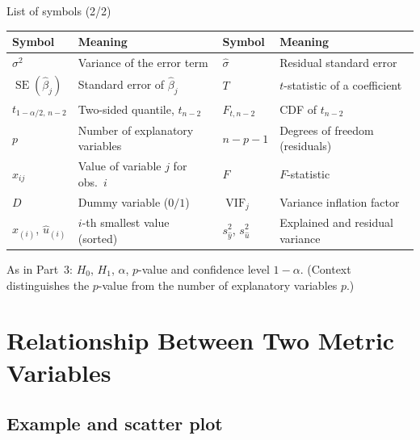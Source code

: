 \documentclass[aspectratio=169,11pt]{beamer}
\begin{document}
\begin{frame}{List of symbols (2/2)}
  \begin{center}
    \small
    \renewcommand{\arraystretch}{1.15}
    \begin{tabular}{@{}l>{\raggedright\arraybackslash}p{4.5cm}l>{\raggedright\arraybackslash}p{4.5cm}@{}}
      \toprule
      \textbf{Symbol} & \textbf{Meaning} & \textbf{Symbol} & \textbf{Meaning} \\
      \midrule
      $\sigma^2$ & Variance of the error term & $\hat\sigma$ & Residual standard error \\
      $\operatorname{SE}(\hat\beta_j)$ & Standard error of $\hat\beta_j$ & $T$ & $t$-statistic of a coefficient \\
      $t_{1-\alpha/2,\,n-2}$ & Two-sided quantile, $t_{n-2}$ & $F_{t,n-2}$ & CDF of $t_{n-2}$ \\
      $p$ & Number of explanatory variables & $n-p-1$ & Degrees of freedom (residuals) \\
      $x_{ij}$ & Value of variable $j$ for obs.\ $i$ & $F$ & $F$-statistic \\
      $D$ & Dummy variable ($0/1$) & $\operatorname{VIF}_j$ & Variance inflation factor \\
      $x_{(i)}$, $\hat u_{(i)}$ & $i$-th smallest value (sorted) & $s_{\hat y}^2$, $s_{\hat u}^2$ & Explained and residual variance \\
      \bottomrule
    \end{tabular}
  \end{center}
  \begin{center}
    \footnotesize As in Part~3: $H_0$, $H_1$, $\alpha$, $p$-value and
    confidence level $1-\alpha$. (Context distinguishes the $p$-value from the
    number of explanatory variables $p$.)
  \end{center}
\end{frame}

\section[Correlation]{Relationship Between Two Metric Variables}

\subsection{Example and scatter plot}
\end{document}
